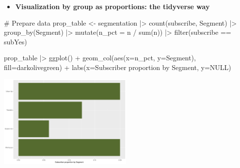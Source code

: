 \documentclass[
  ignorenonframetext,
]{beamer}
\newenvironment{Shaded}{\begin{snugshade}}{\end{snugshade}}
\newcommand{\AttributeTok}[1]{\textcolor[rgb]{0.40,0.45,0.13}{#1}}
\newcommand{\CommentTok}[1]{\textcolor[rgb]{0.37,0.37,0.37}{#1}}
\newcommand{\ConstantTok}[1]{\textcolor[rgb]{0.56,0.35,0.01}{#1}}
\newcommand{\FunctionTok}[1]{\textcolor[rgb]{0.28,0.35,0.67}{#1}}
\newcommand{\NormalTok}[1]{\textcolor[rgb]{0.00,0.23,0.31}{#1}}
\newcommand{\OtherTok}[1]{\textcolor[rgb]{0.00,0.23,0.31}{#1}}
\newcommand{\SpecialCharTok}[1]{\textcolor[rgb]{0.37,0.37,0.37}{#1}}
\newcommand{\StringTok}[1]{\textcolor[rgb]{0.13,0.47,0.30}{#1}}
\providecommand{\tightlist}{%
  \setlength{\itemsep}{0pt}\setlength{\parskip}{0pt}}\usepackage{longtable,booktabs,array}
\begin{document}
\begin{frame}[fragile]{}
\label{section-16}
\begin{itemize}
\tightlist
\item
  \textbf{Visualization by group as proportions: the tidyverse way}
\end{itemize}

\tiny

\begin{Shaded}
\begin{Highlighting}[]
\CommentTok{\# Prepare data}
\NormalTok{prop\_table }\OtherTok{\textless{}{-}}\NormalTok{ segmentation }\SpecialCharTok{|\textgreater{}}
  \FunctionTok{count}\NormalTok{(subscribe, Segment) }\SpecialCharTok{|\textgreater{}}
  \FunctionTok{group\_by}\NormalTok{(Segment) }\SpecialCharTok{|\textgreater{}}
  \FunctionTok{mutate}\NormalTok{(}\AttributeTok{n\_pct =}\NormalTok{ n }\SpecialCharTok{/} \FunctionTok{sum}\NormalTok{(n)) }\SpecialCharTok{|\textgreater{}}
  \FunctionTok{filter}\NormalTok{(subscribe }\SpecialCharTok{==} \StringTok{\textquotesingle{}subYes\textquotesingle{}}\NormalTok{)}
\end{Highlighting}
\end{Shaded}

\begin{Shaded}
\begin{Highlighting}[]
\NormalTok{prop\_table }\SpecialCharTok{|\textgreater{}} \FunctionTok{ggplot}\NormalTok{() }\SpecialCharTok{+} 
  \FunctionTok{geom\_col}\NormalTok{(}\FunctionTok{aes}\NormalTok{(}\AttributeTok{x=}\NormalTok{n\_pct, }\AttributeTok{y=}\NormalTok{Segment),}
           \AttributeTok{fill=}\StringTok{\textquotesingle{}darkolivegreen\textquotesingle{}}\NormalTok{) }\SpecialCharTok{+}
  \FunctionTok{labs}\NormalTok{(}\AttributeTok{x=}\StringTok{\textquotesingle{}Subscriber proportion by Segment\textquotesingle{}}\NormalTok{, }
       \AttributeTok{y=}\ConstantTok{NULL}\NormalTok{)}
\end{Highlighting}
\end{Shaded}

\begin{center}
\includegraphics[width=0.5\textwidth,height=\textheight]{005_comparing_groups_tables_and_visualizations_files/figure-beamer/unnamed-chunk-16-1.pdf}
\end{center}
\end{frame}
\end{document}
